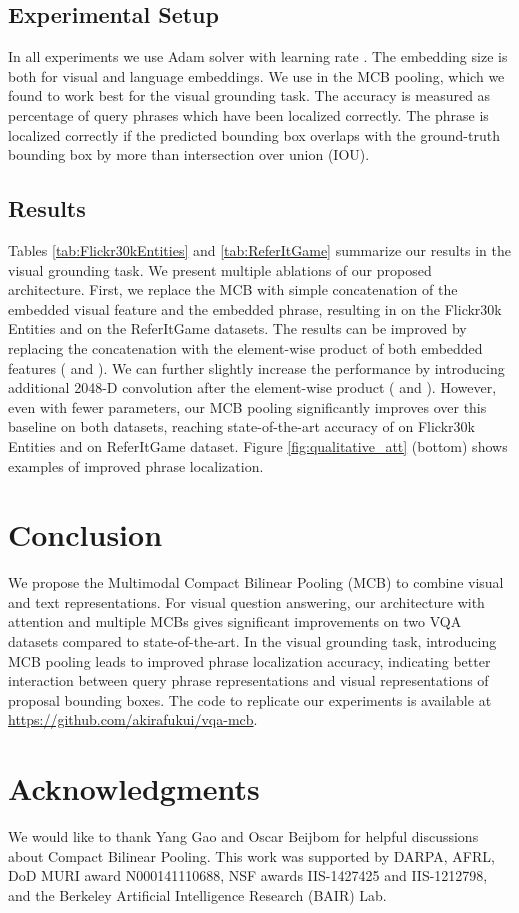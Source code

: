 \documentclass[11pt,letterpaper]{article}
\begin{document}
\subsection{Experimental Setup}
In all experiments we use Adam solver \cite{kingma2014adam} with learning rate . The embedding size is  both for visual and language embeddings. We use  in the MCB pooling, which we found to work best for the visual grounding task. The accuracy is measured as percentage of query phrases which have been localized correctly. The phrase is localized correctly if the predicted bounding box overlaps with the ground-truth bounding box by more than  intersection over union (IOU).


\subsection{Results}
Tables \ref{tab:Flickr30kEntities} and \ref{tab:ReferItGame} summarize our results in the visual grounding task. We present multiple ablations of our proposed architecture. First, we replace the MCB with simple concatenation of the embedded visual feature and the embedded phrase, resulting in  on the Flickr30k Entities and  on the ReferItGame datasets. The results can be improved by replacing the concatenation with the element-wise product of both embedded features ( and ). We can further slightly increase the performance by introducing additional 2048-D convolution after the element-wise product ( and ). However, even with fewer parameters, our MCB pooling significantly improves over this baseline on both datasets, reaching state-of-the-art accuracy of  on Flickr30k Entities and  on ReferItGame dataset. Figure \ref{fig:qualitative_att} (bottom) shows examples of improved phrase localization.


\section{Conclusion}
We propose the Multimodal Compact Bilinear Pooling (MCB) to combine visual and text representations. For visual question answering, our architecture with attention and multiple MCBs gives significant improvements on two VQA datasets compared to state-of-the-art. In the visual grounding task, introducing MCB pooling leads to improved phrase localization accuracy, indicating better interaction between query phrase representations and visual representations of proposal bounding boxes. The code to replicate our experiments is available at \url{https://github.com/akirafukui/vqa-mcb}.

\section*{Acknowledgments}
We would like to thank Yang Gao and Oscar Beijbom for helpful discussions about Compact Bilinear Pooling.
This work was supported by DARPA, AFRL, DoD MURI award N000141110688, NSF awards IIS-1427425 and IIS-1212798, and the Berkeley Artificial Intelligence Research (BAIR) Lab.



\end{document}
